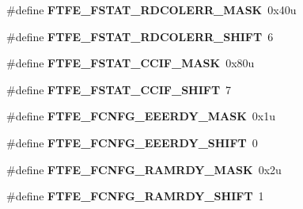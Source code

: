 \begin{DoxyCompactItemize}
\item 
\hypertarget{group___f_t_f_e___register___masks_ga2b7a9107390c7761ae8c4d5a4f8941af}{}\#define {\bfseries F\+T\+F\+E\+\_\+\+F\+S\+T\+A\+T\+\_\+\+R\+D\+C\+O\+L\+E\+R\+R\+\_\+\+M\+A\+S\+K}~0x40u\label{group___f_t_f_e___register___masks_ga2b7a9107390c7761ae8c4d5a4f8941af}

\item 
\hypertarget{group___f_t_f_e___register___masks_ga434a96f6b56c1c08f0f8c9e8c50ed9a8}{}\#define {\bfseries F\+T\+F\+E\+\_\+\+F\+S\+T\+A\+T\+\_\+\+R\+D\+C\+O\+L\+E\+R\+R\+\_\+\+S\+H\+I\+F\+T}~6\label{group___f_t_f_e___register___masks_ga434a96f6b56c1c08f0f8c9e8c50ed9a8}

\item 
\hypertarget{group___f_t_f_e___register___masks_gab1b2afd287fd5012f586840b391110a9}{}\#define {\bfseries F\+T\+F\+E\+\_\+\+F\+S\+T\+A\+T\+\_\+\+C\+C\+I\+F\+\_\+\+M\+A\+S\+K}~0x80u\label{group___f_t_f_e___register___masks_gab1b2afd287fd5012f586840b391110a9}

\item 
\hypertarget{group___f_t_f_e___register___masks_gac879e7876e19c43bd3d04bc1272e1be5}{}\#define {\bfseries F\+T\+F\+E\+\_\+\+F\+S\+T\+A\+T\+\_\+\+C\+C\+I\+F\+\_\+\+S\+H\+I\+F\+T}~7\label{group___f_t_f_e___register___masks_gac879e7876e19c43bd3d04bc1272e1be5}

\item 
\hypertarget{group___f_t_f_e___register___masks_gabd7f0b0695b1e55349fef4587df62034}{}\#define {\bfseries F\+T\+F\+E\+\_\+\+F\+C\+N\+F\+G\+\_\+\+E\+E\+E\+R\+D\+Y\+\_\+\+M\+A\+S\+K}~0x1u\label{group___f_t_f_e___register___masks_gabd7f0b0695b1e55349fef4587df62034}

\item 
\hypertarget{group___f_t_f_e___register___masks_ga9587828c6c069eca8571ac30f362db64}{}\#define {\bfseries F\+T\+F\+E\+\_\+\+F\+C\+N\+F\+G\+\_\+\+E\+E\+E\+R\+D\+Y\+\_\+\+S\+H\+I\+F\+T}~0\label{group___f_t_f_e___register___masks_ga9587828c6c069eca8571ac30f362db64}

\item 
\hypertarget{group___f_t_f_e___register___masks_gabfae504593e38f672188b415d986d4d3}{}\#define {\bfseries F\+T\+F\+E\+\_\+\+F\+C\+N\+F\+G\+\_\+\+R\+A\+M\+R\+D\+Y\+\_\+\+M\+A\+S\+K}~0x2u\label{group___f_t_f_e___register___masks_gabfae504593e38f672188b415d986d4d3}

\item 
\hypertarget{group___f_t_f_e___register___masks_ga112f1ba27f929163498d8ba3f6fb6fdc}{}\#define {\bfseries F\+T\+F\+E\+\_\+\+F\+C\+N\+F\+G\+\_\+\+R\+A\+M\+R\+D\+Y\+\_\+\+S\+H\+I\+F\+T}~1\label{group___f_t_f_e___register___masks_ga112f1ba27f929163498d8ba3f6fb6fdc}


\end{DoxyCompactItemize}
